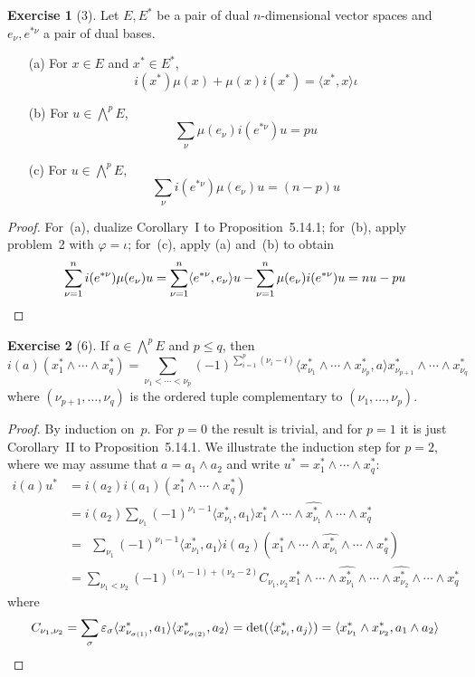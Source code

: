 \documentclass[letterpaper,12pt]{article}
\newcommand{\eprod}{\wedge}
\newcommand{\bigeprod}{\bigwedge}
\newcommand{\medeprod}{{\textstyle\bigeprod}}
\newcommand{\delete}{\widehat}
\newcommand{\sprod}[2]{\langle#1,#2\rangle}
\newcommand{\multi}[4]{#2_{#3}#1\cdots#1#2_{#4}}
\newcommand{\eprods}[3]{\multi{\eprod}{#1}{#2}{#3}}
\newcommand{\sign}[1]{\varepsilon_{#1}}
\theoremstyle{definition}
\newtheorem*{exer}{Exercise}
\theoremstyle{remark}
\begin{document}
\begin{exer}[3]
Let \(E,E^*\) be a pair of dual \(n\)-dimensional vector spaces and \(e_{\nu},e^{*\nu}\) a pair of dual bases.
\begin{enumerate}
\item[(a)] For \(x\in E\) and \(x^*\in E^*\),
\[i(x^*)\mu(x)+\mu(x)i(x^*)=\sprod{x^*}{x}\iota\]
\item[(b)] For \(u\in\medeprod^p E\),
\[\sum_{\nu}\mu(e_{\nu})i(e^{*\nu})u=pu\]
\item[(c)] For \(u\in\medeprod^p E\),
\[\sum_{\nu}i(e^{*\nu})\mu(e_{\nu})u=(n-p)u\]
\end{enumerate}
\end{exer}
\begin{proof}
For~(a), dualize Corollary~I to Proposition~5.14.1; for~(b), apply problem~2 with \(\varphi=\iota\); for~(c), apply (a) and~(b) to obtain
\[\sum_{\nu=1}^n i(e^{*\nu})\mu(e_{\nu})u=\sum_{\nu=1}^n\sprod{e^{*\nu}}{e_{\nu}}u-\sum_{\nu=1}^n\mu(e_{\nu})i(e^{*\nu})u=nu-pu\qedhere\]
\end{proof}

\begin{exer}[6]
If \(a\in\medeprod^p E\) and \(p\le q\), then
\[i(a)(\eprods{x^*}{1}{q})=\sum_{\nu_1<\cdots<\nu_p}(-1)^{\sum_{i=1}^p(\nu_i-i)}\sprod{\eprods{x^*}{\nu_1}{\nu_p}}{a}\eprods{x^*}{\nu_{p+1}}{\nu_q}\]
where \((\nu_{p+1},\ldots,\nu_q)\) is the ordered tuple complementary to \((\nu_1,\ldots,\nu_p)\).
\end{exer}
\begin{proof}
By induction on~\(p\). For \(p=0\) the result is trivial, and for \(p=1\) it is just Corollary~II to Proposition~5.14.1. We illustrate the induction step for \(p=2\), where we may assume that \(a=a_1\eprod a_2\) and write \(u^*=\eprods{x^*}{1}{q}\):
\begin{align*}
i(a)u^*&=i(a_2)i(a_1)(\eprods{x^*}{1}{q})\\
	&=i(a_2)\sum_{\nu_1}(-1)^{\nu_1-1}\sprod{x^*_{\nu_1}}{a_1}x^*_1\eprod\cdots\eprod\delete{x^*_{\nu_1}}\eprod\cdots\eprod x^*_q\\
	&=\ \ \sum_{\nu_1}(-1)^{\nu_1-1}\sprod{x^*_{\nu_1}}{a_1}i(a_2)(x^*_1\eprod\cdots\eprod\delete{x^*_{\nu_1}}\eprod\cdots\eprod x^*_q)\\
	&=\sum_{\nu_1<\nu_2}(-1)^{(\nu_1-1)+(\nu_2-2)}C_{\nu_1,\nu_2} x^*_1\eprod\cdots\eprod\delete{x^*_{\nu_1}}\eprod\cdots\eprod\delete{x^*_{\nu_2}}\eprod\cdots\eprod x^*_q
\end{align*}
where
\[C_{\nu_1,\nu_2}=\sum_{\sigma}\sign{\sigma}\sprod{x^*_{\nu_{\sigma(1)}}}{a_1}\sprod{x^*_{\nu_{\sigma(2)}}}{a_2}=\det(\sprod{x^*_{\nu_i}}{a_j})=\sprod{x^*_{\nu_1}\eprod x^*_{\nu_2}}{a_1\eprod a_2}\qedhere\]
\end{proof}
\end{document}
